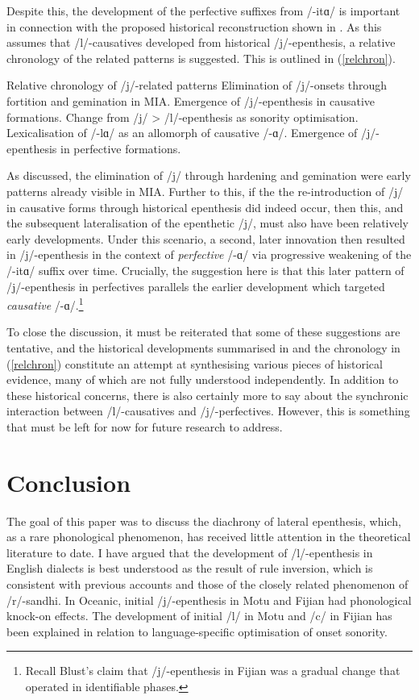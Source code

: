 \documentclass[output=paper,colorlinks,citecolor=brown]{langscibook}
\begin{document}
Despite this, the development of the perfective suffixes from /-itɑ/ is important in connection with the proposed historical reconstruction shown in . As this assumes that /l/-causatives developed from historical /j/-epenthesis, a relative chronology of the related patterns is suggested. This is outlined in (\ref{relchron}).
\largerpage

\ea Relative chronology of /j/-related patterns\label{relchron}
  \ea Elimination of /j/-onsets through fortition and gemination in MIA. 
  \ex Emergence of /j/-epenthesis in causative formations. 
  \ex Change from /j/ > /l/-epenthesis as sonority optimisation. 
  \ex Lexicalisation of /-lɑ/ as an allomorph of causative /-ɑ/. 
  \ex Emergence of /j/-epenthesis in perfective formations. 
  \z
\z

As discussed, the elimination of /j/ through hardening and gemination were early patterns already visible in MIA. Further to this, if the the re-introduction of /j/ in causative forms through historical epenthesis did indeed occur, then this, and the subsequent lateralisation of the epenthetic /j/, must also have been relatively early developments.  Under this scenario, a second, later innovation then resulted in /j/-epenthesis in the context of \textit{perfective} /-ɑ/ via progressive weakening of the /-itɑ/ suffix over time.  Crucially, the suggestion here is that this later pattern of /j/-epenthesis in perfectives parallels the earlier development which targeted \textit{causative} /-ɑ/.\footnote{Recall Blust's claim that /j/-epenthesis in Fijian was a gradual change that operated in identifiable phases.} 

To close the discussion, it must be reiterated that some of these suggestions are tentative, and the historical developments summarised in  and the chronology in (\ref{relchron}) constitute an attempt at synthesising various pieces of historical evidence, many of which are not fully understood independently. In addition to these historical concerns, there is also certainly more to say about the synchronic interaction between /l/-causatives and /j/-perfectives.  However, this is something that must be left for now for future research to address.


\section{Conclusion}\label{ramsammy:concl}
The goal of this paper was to discuss the diachrony of lateral epenthesis, which, as a rare phonological phenomenon, has received little attention in the theoretical literature to date.  I have argued that the development of /l/-epenthesis in English dialects is best understood as the result of rule inversion, which is consistent with previous accounts and those of the closely related phenomenon of /r/-sandhi.  In Oceanic, initial /j/-epenthesis in Motu and Fijian had phonological knock-on effects.  The development of initial /l/ in Motu and /c/ in Fijian has been explained in relation to language-specific optimisation of onset sonority.  
\end{document}
